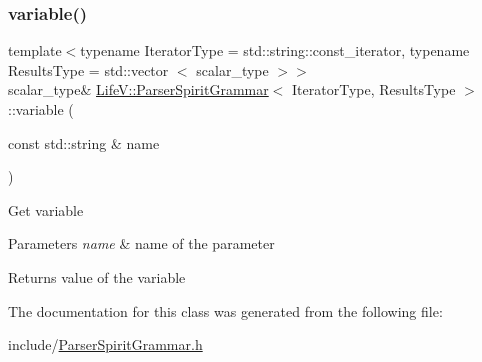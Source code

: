 \subsubsection{\texorpdfstring{variable()}{variable()}}
{\footnotesize\ttfamily template$<$typename Iterator\+Type = std\+::string\+::const\+\_\+iterator, typename Results\+Type = std\+::vector $<$ scalar\+\_\+type $>$$>$ \\
scalar\+\_\+type\& \hyperlink{classLifeV_1_1ParserSpiritGrammar}{Life\+V\+::\+Parser\+Spirit\+Grammar}$<$ Iterator\+Type, Results\+Type $>$\+::variable (\begin{DoxyParamCaption}\item[{const std\+::string \&}]{name }\end{DoxyParamCaption})\hspace{0.3cm}{\ttfamily [inline]}}

Get variable


\begin{DoxyParams}{Parameters}
{\em name} & name of the parameter \\
\hline
\end{DoxyParams}
\begin{DoxyReturn}{Returns}
value of the variable 
\end{DoxyReturn}


The documentation for this class was generated from the following file\+:\begin{DoxyCompactItemize}
\item 
include/\hyperlink{ParserSpiritGrammar_8h}{Parser\+Spirit\+Grammar.\+h}\end{DoxyCompactItemize}
